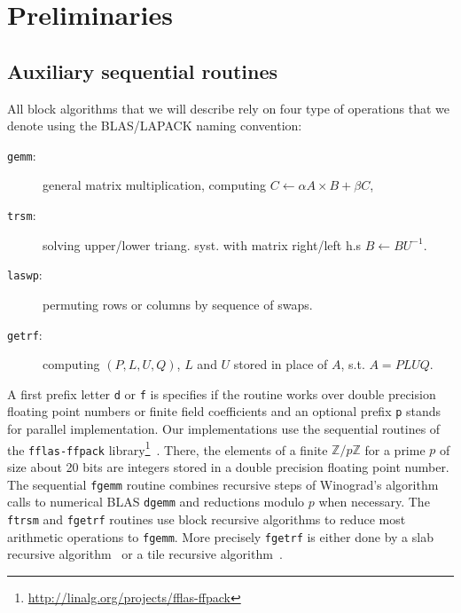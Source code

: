 \documentclass{article}
\newcommand{\gemm}{\texttt{gemm}\xspace}
\newcommand{\fgemm}{\texttt{fgemm}\xspace}
\newcommand{\dgemm}{\texttt{dgemm}\xspace}
\newcommand{\trsm}{\texttt{trsm}\xspace}
\newcommand{\ftrsm}{\texttt{ftrsm}\xspace}
\newcommand{\laswp}{\texttt{laswp}\xspace}
\newcommand{\getrf}{\texttt{getrf}\xspace}
\newcommand{\fgetrf}{\texttt{fgetrf}\xspace}
\newcommand{\fflasffpack}{\texttt{fflas-ffpack}\xspace}
\newcommand{\Z}{\ensuremath{\mathbb{Z}}\xspace}
\begin{document}
 

 
 
\section{Preliminaries}
 
\label{sec:prelim}

 
\subsection{Auxiliary sequential routines}

All block algorithms that we will describe rely on four type of operations that
we denote using the BLAS/LAPACK naming convention:
\vspace{-2mm}
\begin{description}
  \item[\gemm:] general matrix multiplication, computing $C\leftarrow \alpha
    A\times B +\beta C$,
  \item[\trsm:] solving upper/lower triang. syst. with matrix right/left h.s $B\leftarrow B
    U^{-1}$.
  \item[\laswp:] permuting rows or columns by sequence of swaps. 
 
  \item[\getrf:] 
 
computing $(P,L,U,Q)$, $L$ and $U$ stored in place
    of $A$, s.t. $A=PLUQ$.
\end{description}
\vspace{-2mm}

A first prefix letter \texttt{d} or \texttt{f} is specifies if the routine
works over double precision floating point numbers or finite field coefficients
and an optional prefix \texttt{p} stands for parallel implementation.
Our implementations use the sequential routines of the \fflasffpack
library\footnote{\url{http://linalg.org/projects/fflas-ffpack}}~\cite{DGP08}. There,
the elements of a finite $\Z/p\Z$ for a prime $p$ of size about 20 bits
are integers stored in a double precision floating point number. The sequential
\fgemm routine combines recursive steps of Winograd's algorithm calls to
numerical BLAS \dgemm and reductions modulo $p$ when necessary. The \ftrsm and
\fgetrf routines use block recursive algorithms to reduce most arithmetic
operations to \fgemm. More precisely \fgetrf is either done by a slab
recursive algorithm~\cite{DGP08} or a tile recursive algorithm~\cite{DPS13}.

 
 
 
 
\end{document}
